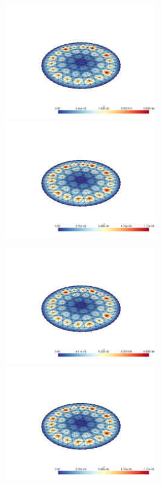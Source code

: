 \documentclass[
  11pt,
]{article}
\let\origfigure\figure
\let\endorigfigure\endfigure
\renewenvironment{figure}[1][2] {
    \expandafter\origfigure\expandafter[H]
} {
    \endorigfigure
}
\begin{document}
\begin{figure}
\caption{Finite element error in the L2 and H1 norms/seminorms, respectively for problem 1 over mesh number 2 using order 2 quadrature.}
\end{figure}

\includegraphics[width=0.5\textwidth,height=\textheight]{../img/mesh2-gauss05-b-L2.png}
\includegraphics[width=0.5\textwidth,height=\textheight]{../img/mesh2-gauss05-b-H1.png}

\begin{figure}
\caption{Finite element error in the L2 and H1 norms/seminorms, respectively for problem 1 over mesh number 2 using order 5 quadrature.}
\end{figure}

\includegraphics[width=0.5\textwidth,height=\textheight]{../img/mesh2-gauss08-b-L2.png}
\includegraphics[width=0.5\textwidth,height=\textheight]{../img/mesh2-gauss08-b-H1.png}
\end{document}
